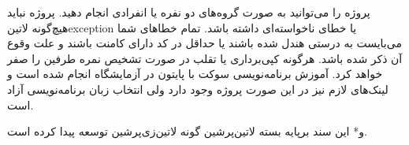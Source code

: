 \documentclass[]{article}
\begin{document}

   پروژه را می‌توانید به صورت گروه‌های دو نفره یا انفرادی انجام دهید.
   پروژه نباید هیچ‌گونه ‌لاتین{exception} یا خطای ناخواسته‌ای داشته باشد. تمام خطاهای شما می‌بایست به درستی هندل شده باشند یا حداقل در کد دارای کامنت باشند و علت وقوع آن ذکر شده باشد.
   هرگونه کپی‌برداری یا تقلب در صورت تشخیص نمره طرفین را صفر خواهد کرد.
   آموزش برنامه‌نویسی سوکت با پایتون در آزمایشگاه انجام شده است و لینک‌های لازم نیز در این صورت پروژه وجود دارد ولی انتخاب زبان برنامه‌نویسی آزاد است.

  ‌و*{}
این سند برپایه بسته ‌لاتین{‌پرشین} گونه ‌لاتین{‌زی‌پرشین} توسعه پیدا کرده است.
\end{document}
